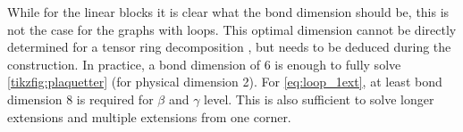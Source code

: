 While for the linear blocks it is clear what the bond dimension should be, this is not the case for the graphs with loops. This optimal dimension cannot be directly determined for a tensor ring decomposition \cite{Zhao2016}, but needs to be deduced during the construction. In practice, a bond dimension of 6 is enough to fully solve \cref{tikzfig:plaquetter} (for physical dimension 2). For \cref{eq:loop_1ext}, at least bond dimension 8 is required for $\beta$ and $\gamma$ level. This is also sufficient to solve longer extensions and multiple extensions from one corner.

